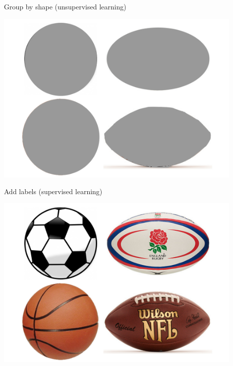 \documentclass[pdf]{beamer}
\begin{document}
\begin{frame}{Group by shape (unsupervised learning)}
\begin{center}
	\includegraphics[width=0.9\textwidth]{flashcardHidden.png}
\end{center}
\end{frame}
\begin{frame}{Add labels (supervised learning)}
\begin{center}
	\includegraphics[width=0.9\textwidth]{flashcardExposed.png}
\end{center}
\end{frame}
\end{document}
